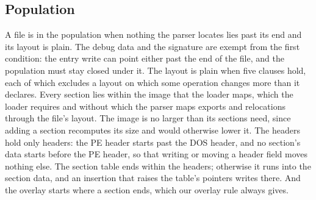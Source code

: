 \subsection{Population}
\label{sec:ember:population}

A file is in the population when nothing the parser locates lies past its end and its layout is plain. The debug data
and the signature are exempt from the first condition: the entry write can point either past the end of the file, and
the population must stay closed under it. The layout is plain when five clauses hold, each of which excludes a layout
on which some operation changes more than it declares. Every section lies within the image that the loader maps, which
the loader requires and without which the parser maps exports and relocations through the file's layout. The image is
no larger than its sections need, since adding a section recomputes its size and would otherwise lower it. The headers
hold only headers: the PE header starts past the DOS header, and no section's data starts before the PE header, so
that writing or moving a header field moves nothing else. The section table ends within the headers; otherwise it runs
into the section data, and an insertion that raises the table's pointers writes there. And the overlay starts where a
section ends, which our overlay rule always gives.
